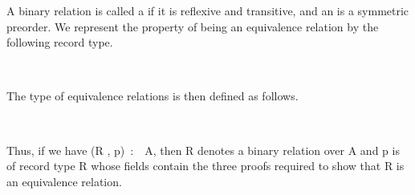 A binary relation is called a  if it is reflexive and transitive, and an  is a symmetric preorder. We represent the property of being an equivalence relation by the following record type.
\ccpad
\begin{code}%
\>[1]\AgdaSpace{}%
\AgdaSpace{}%
\AgdaSymbol{\{}\AgdaSpace{}%
\AgdaSymbol{:}\AgdaSpace{}%
\AgdaSpace{}%
\AgdaSymbol{\}(}\AgdaSpace{}%
\AgdaSymbol{:}\AgdaSpace{}%
\AgdaSpace{}%
\AgdaSpace{}%
\AgdaSymbol{)}\AgdaSpace{}%
\AgdaSymbol{:}\AgdaSpace{}%
\AgdaSpace{}%
\AgdaSpace{}%
\AgdaSpace{}%
\AgdaSpace{}%
\<%
\\
\>[1][@{}l@{\AgdaIndent{0}}]%
\>[2]\AgdaSpace{}%
\AgdaSpace{}%
\AgdaSymbol{:}\AgdaSpace{}%
\AgdaSpace{}%
\AgdaSymbol{;}\AgdaSpace{}%
\AgdaSpace{}%
\AgdaSymbol{:}\AgdaSpace{}%
\AgdaSpace{}%
\AgdaSymbol{;}\AgdaSpace{}%
\AgdaSpace{}%
\AgdaSymbol{:}\AgdaSpace{}%
\AgdaSpace{}%
\<%
\end{code}
\ccpad
The type of equivalence relations is then defined as follows.
\ccpad
\begin{code}
\>[1]\AgdaSpace{}%
\AgdaSymbol{:}\AgdaSpace{}%
\AgdaSpace{}%
\AgdaSpace{}%
\AgdaSpace{}%
\AgdaSpace{}%
\AgdaSpace{}%
\AgdaSpace{}%
\AgdaSpace{}%
\<%
\\
%
\>[1]\AgdaSpace{}%
\AgdaSpace{}%
\AgdaSymbol{=}\AgdaSpace{}%
\AgdaSpace{}%
\AgdaSpace{}%
\AgdaSpace{}%
\AgdaSpace{}%
\AgdaSpace{}%
\AgdaSpace{}%
\AgdaFunction{,}\AgdaSpace{}%
\AgdaSpace{}%
\<%
\end{code}
\ccpad
Thus, if we have (\ab R , \ab p)~\as :~~\ab A, then \ab R denotes a binary relation over \ab A and \ab p is of record type  \ab R whose fields contain the three proofs required to show that \ab R is an equivalence relation.

